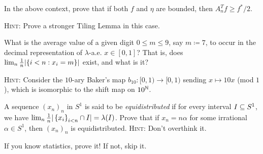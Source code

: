\documentclass[reqno, twoside]{article}
\begin{document}
    \begin{exercise}
        In the above context, prove that if both $f$ and $\eta$ are bounded, then $A_n^Tf\geq f^\ast/2$.

        \textsc{Hint}: Prove a stronger Tiling Lemma in this case.
    \end{exercise}

    \begin{exercise}
        What is the average value of a given digit $0\leq m\leq9$, say $m\coloneqq7$, to occur in the decimal representation of $\lambda$-a.e. $x\in[0,1]$? That is, does $\lim_n\frac{1}{n}|\{i<n: x_i=m\}|$ exist, and what is it?

        \textsc{Hint:} Consider the $10$-ary Baker's map $b_{10}:[0,1)\to[0,1)$  sending $x\mapsto 10x$ (mod $1$), which is isomorphic to the shift map on $10^{\mathbb{N}}$.
    \end{exercise}

    \begin{exercise}
        A sequence $(x_n)_n$ in $S^1$ is said to be \textit{equidistributed} if for every interval $I\subseteq S^1$, we have $\lim_n\frac{1}{n}|\left\{x_i\right\}_{i<n}\cap I|=\lambda(I)$. Prove that if $x_n=n\alpha$ for some irrational $\alpha\in S^1$, then $(x_n)_n$ is equidistributed. \textsc{Hint:} Don't overthink it.
    \end{exercise}

    \begin{exercise}
        If you know statistics, prove it! If not, skip it.
    \end{exercise}
\end{document}
